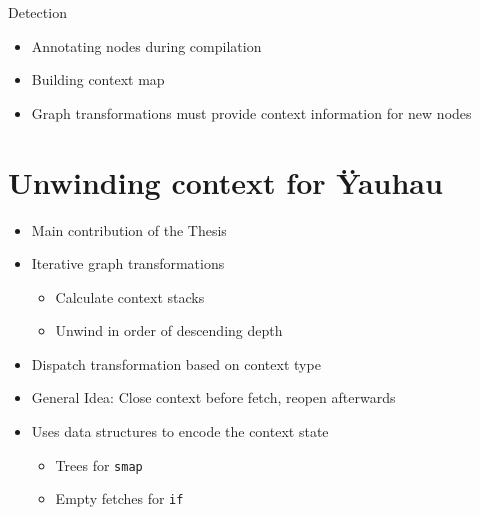 \begin{frame}{Detection}

\begin{itemize}[<+->]
\tightlist
\item
  Annotating nodes during compilation
\item
  Building context map
\item
  Graph transformations must provide context information for new nodes
\end{itemize}

\end{frame}

\section{Unwinding context for
Ÿauhau}\label{unwinding-context-for-uxffauhau}

\begin{frame}

\begin{itemize}[<+->]
\tightlist
\item
  Main contribution of the Thesis
\item
  Iterative graph transformations

  \begin{itemize}[<+->]
  \tightlist
  \item
    Calculate context stacks
  \item
    Unwind in order of descending depth
  \end{itemize}
\item
  Dispatch transformation based on context type
\end{itemize}

\end{frame}

\begin{frame}[fragile]

\begin{itemize}[<+->]
\tightlist
\item
  General Idea: Close context before fetch, reopen afterwards
\item
  Uses data structures to encode the context state

  \begin{itemize}[<+->]
  \tightlist
  \item
    Trees for \texttt{smap}
  \item
    Empty fetches for \texttt{if}
  \end{itemize}
\end{itemize}

\end{frame}

